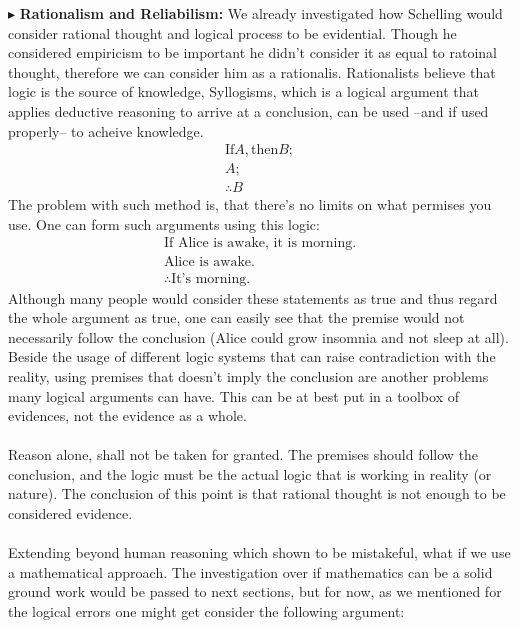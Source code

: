 \documentclass[9pt,a4paper,twocolumn]{article}
\newcommand{\newpoint}[1]{\indent$\blacktriangleright$ \textbf{#1}}
\begin{document}
            \newpoint{Rationalism and Reliabilism:} We already investigated how Schelling would consider rational thought and logical process to be evidential. Though he considered empiricism to be important he didn't consider it as equal to ratoinal thought, therefore we can consider him as a rationalis. Rationalists believe that logic is the source of knowledge, Syllogisms, which is a logical argument that applies deductive reasoning to arrive at a conclusion, can be used --and if used properly-- to acheive knowledge. \cite{enwiki:1145200450}
            \begin{align*}
                \text{If} A, \text{then} B;
                \\ A;
                \\ \therefore B
            \end{align*}
            The problem with such method is, that there's no limits on what permises you use. One can form such arguments using this logic:
            \begin{align*}
                \text{If Alice is awake, it is morning.}
                \\ \text {Alice is awake.}
                \\ \therefore \text{It's morning.}
            \end{align*}
            Although many people would consider these statements as true and thus regard the whole argument as true, one can easily see that the premise would not necessarily follow the conclusion (Alice could grow insomnia and not sleep at all). Beside the usage of different logic systems that can raise contradiction with the reality, using premises that doesn't imply the conclusion are another problems many logical arguments can have. This can be at best put in a toolbox of evidences, not the evidence as a whole.
            \\
            \\
            Reason alone, shall not be taken for granted. The premises should follow the conclusion, and the logic must be the actual logic that is working in reality (or nature). The conclusion of this point is that rational thought is not enough to be considered evidence. \cite{CW/E}
            \\
            \\
            Extending beyond human reasoning which shown to be mistakeful, what if we use a mathematical approach. The investigation over if mathematics can be a solid ground work would be passed to next sections, but for now, as we mentioned for the logical errors one might get consider the following argument:
\end{document}
